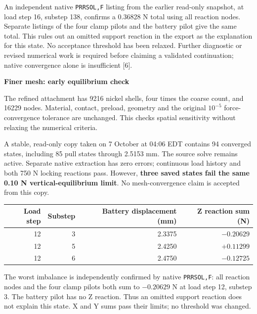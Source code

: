 \documentclass[10pt,a4paper]{article}
\newcommand{\PageTitle}[1]{{\LARGE\bfseries\color{Navy}#1\par}\vspace{7pt}}
\begin{document}
An independent native \texttt{PRRSOL,F} listing from the earlier read-only snapshot, at load step 16, substep 138, confirms a 0.36828 N total using all reaction nodes. Separate listings of the four clamp pilots and the battery pilot give the same total. This rules out an omitted support reaction in the export as the explanation for this state. No acceptance threshold has been relaxed. Further diagnostic or revised numerical work is required before claiming a validated continuation; native convergence alone is insufficient [6].

\clearpage
\PageTitle{Finer mesh: early equilibrium check}
The refined attachment has 9216 nickel shells, four times the coarse count, and 16229 nodes. Material, contact, preload, geometry and the original $10^{-5}$ force-convergence tolerance are unchanged. This checks spatial sensitivity without relaxing the numerical criteria.

A stable, read-only copy taken on 7 October at 04:06 EDT contains 94 converged states, including 85 pull states through 2.5153 mm. The source solve remains active. Separate native extraction has zero errors; continuous load history and both 750 N locking reactions pass. However, \textbf{three saved states fail the same 0.10 N vertical-equilibrium limit}. No mesh-convergence claim is accepted from this copy.

\begin{center}
\begin{tabular}{rrrr}\toprule
Load step & Substep & Battery displacement (mm) & Z reaction sum (N)\\\midrule
12 & 3 & 2.3375 & $-0.20629$\\
12 & 5 & 2.4250 & $+0.11299$\\
12 & 6 & 2.4750 & $-0.12725$\\\bottomrule
\end{tabular}
\end{center}
The worst imbalance is independently confirmed by native \texttt{PRRSOL,F}: all reaction nodes and the four clamp pilots both sum to $-0.20629$ N at load step 12, substep 3. The battery pilot has no Z reaction. Thus an omitted support reaction does not explain this state. X and Y sums pass their limits; no threshold was changed.
\end{document}
